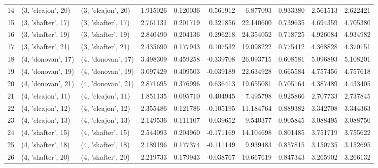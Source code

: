 \begin{tabular}{lllrrrrrrr}
14 &  (3, 'elcajon', 20) &  (3, 'elcajon', 20) &  1.915026 &   0.120036 &  0.561912 &   6.877093 &  0.933380 &   2.561513 &  2.622421 \\
15 &  (3, 'shafter', 17) &  (3, 'shafter', 17) &  2.761131 &   0.201719 &  0.321856 &  22.140600 &  0.739635 &   4.694359 &  4.705380 \\
16 &  (3, 'shafter', 19) &  (3, 'shafter', 19) &  2.840490 &   0.204136 &  0.296218 &  24.354052 &  0.718725 &   4.926084 &  4.934982 \\
17 &  (3, 'shafter', 21) &  (3, 'shafter', 21) &  2.435690 &   0.177943 &  0.107532 &  19.098222 &  0.775412 &   4.368828 &  4.370151 \\
18 &  (4, 'donovan', 17) &  (4, 'donovan', 17) &  3.498309 &   0.459258 & -0.339708 &  26.093715 &  0.608581 &   5.096893 &  5.108201 \\
19 &  (4, 'donovan', 19) &  (4, 'donovan', 19) &  3.097429 &   0.409503 & -0.039189 &  22.634928 &  0.665584 &   4.757456 &  4.757618 \\
20 &  (4, 'donovan', 21) &  (4, 'donovan', 21) &  2.871695 &   0.376996 &  0.636413 &  19.655081 &  0.705164 &   4.387489 &  4.433405 \\
21 &  (4, 'elcajon', 11) &  (4, 'elcajon', 11) &  1.851135 &   0.095710 &  0.404945 &   7.495798 &  0.925866 &   2.707733 &  2.737845 \\
22 &  (4, 'elcajon', 12) &  (4, 'elcajon', 12) &  2.355486 &   0.121786 & -0.105195 &  11.184764 &  0.889382 &   3.342708 &  3.344363 \\
23 &  (4, 'elcajon', 13) &  (4, 'elcajon', 13) &  2.149536 &   0.111107 &  0.039652 &   9.540377 &  0.905845 &   3.088495 &  3.088750 \\
24 &  (4, 'shafter', 15) &  (4, 'shafter', 15) &  2.544093 &   0.204960 & -0.171169 &  14.104698 &  0.801485 &   3.751719 &  3.755622 \\
25 &  (4, 'shafter', 18) &  (4, 'shafter', 18) &  2.189196 &   0.177374 & -0.111149 &   9.939483 &  0.857815 &   3.150735 &  3.152695 \\
26 &  (4, 'shafter', 20) &  (4, 'shafter', 20) &  2.219733 &   0.179943 & -0.038767 &  10.667619 &  0.847343 &   3.265902 &  3.266132 \\
\bottomrule
\end{tabular}
